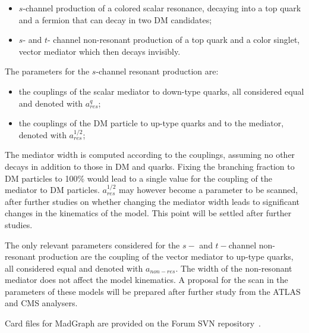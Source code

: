 \documentclass[debug,notitlepage]{dmfm}
\newif\ifATLAS
\newif\ifCMS
\begin{document}
\begin{itemize}
\item $s$-channel production of a colored scalar resonance, decaying into a top quark and a fermion
that can decay in two DM candidates;
\item $s$- and $t$- channel non-resonant production of a top quark and a color singlet, vector mediator which then decays invisibly.
\end{itemize}

The parameters for the $s$-channel resonant production are:
\begin{itemize}
 \item the couplings of the scalar mediator to down-type quarks, all considered equal and denoted with $a_{res}^q$;
 \item the couplings of the DM particle to up-type quarks and to the mediator, denoted with $a_{res}^{1/2}$;
\end{itemize}
The mediator width is computed according to the couplings, assuming no other decays in addition
to those in DM and quarks. Fixing the branching fraction to DM particles to 100\% would lead 
to a single value for the coupling of the mediator to DM particles. $a_{res}^{1/2}$ 
may however become a parameter to be scanned, after further studies on whether changing 
the mediator width leads to significant changes in the kinematics of the model. 
This point will be settled after further studies. 

The only relevant parameters considered for the $s-$ and $t-$channel non-resonant production 
are the coupling of the vector mediator to up-type quarks, all considered equal and denoted with $a_{non-res}$. 
The width of the non-resonant mediator does not affect the model kinematics. 
A proposal for the scan in the parameters of these models will be prepared after further study 
from the ATLAS and CMS analysers. 

Card files for MadGraph are provided on the Forum SVN repository~\cite{ForumSVN_EWMonoTop}.

% 

\ifATLAS
\textbf{[Open point: Add here implementation details for ATLAS.]}
\fi

\ifCMS
\textbf{[Open point: Add here implementation details for CMS..]}
\fi
\end{document}
